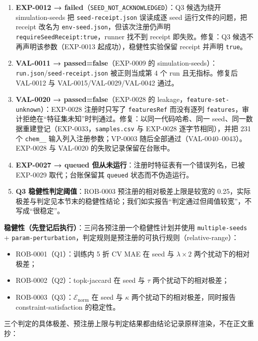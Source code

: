 \documentclass[
  11pt,
]{article}
\providecommand{\tightlist}{%
  \setlength{\itemsep}{0pt}\setlength{\parskip}{0pt}}
\begin{document}
\begin{enumerate}
\def\labelenumi{\arabic{enumi}.}
\tightlist
\item
  \textbf{EXP-0012 → failed}（\texttt{SEED\_NOT\_ACKNOWLEDGED}）：Q3
  候选为绕开 simulation-seeds 把 \texttt{seed-receipt.json} 误读成逐
  seed 运行文件的问题，把 receipt 改名为
  \texttt{env-seed.json}，但该次注册仍声明
  \texttt{requireSeedReceipt:true}，runner 找不到 receipt
  即失败。修复：Q3 候选不再声明该参数（EXP-0013 起成功），稳健性实验保留
  receipt 并声明 \texttt{true}。
\item
  \textbf{VAL-0011 → passed=false}（EXP-0009 的
  simulation-seeds）：\texttt{run.json}/\texttt{seed-receipt.json}
  被正则当成第 4 个 run 且无指标。修复后 VAL-0012 与
  VAL-0015/VAL-0029/VAL-0042 通过。
\item
  \textbf{VAL-0020 → passed=false}（EXP-0028 的
  leakage，\texttt{feature-set-unknown}）：EXP-0028 注册时只写了
  \texttt{featuresRef} 而没有逐列
  \texttt{features}，审计拒绝在``特征集未知''时判通过。修复：以同一代码哈希、同一
  seed、同一数据重建登记（EXP-0033，\texttt{samples.csv} 与 EXP-0028
  逐字节相同），并把 231 个 \texttt{chem\_\_} 输入列入注册参数；VP-0003
  随后全部通过（VAL-0040--0043）。EXP-0028 与 VAL-0020
  的失败记录保留在台账中。
\item
  \textbf{EXP-0027 → queued
  但从未运行}：注册时特征表有一个错误列名，已被 EXP-0029
  取代；台账保留其 \texttt{queued} 状态而不伪造运行。
\item
  \textbf{Q3 稳健性判定阈值}：ROB-0003 预注册的相对极差上限是较宽的
  0.25，实际极差与判定见本节末的稳健性结论；我们如实报告``判定通过但阈值较宽''，不写成``很稳定''。
\end{enumerate}

\textbf{稳健性（先登记后执行）}：三问各预注册一个稳健性计划并使用
\texttt{multiple-seeds} +
\texttt{param-perturbation}，判定规则是预注册的可执行规则（relative-range）：

\begin{itemize}
\tightlist
\item
  ROB-0001（Q1）：训练内 5 折 CV MAE 在 seed 与 \(\lambda\times2\)
  两个扰动下的相对极差；
\item
  ROB-0002（Q2）：topk-jaccard 在 seed 与 \(\tau\)
  两个扰动下的相对极差；
\item
  ROB-0003（Q3）：\(\mathcal E_{\mathrm{norm}}\) 在 seed 与 \(\kappa\)
  两个扰动下的相对极差，同时报告 constraint-satisfaction 的稳定性。
\end{itemize}

三个判定的具体极差、预注册上限与判定结果都由结论记录原样渲染，不在正文重抄：
\end{document}
